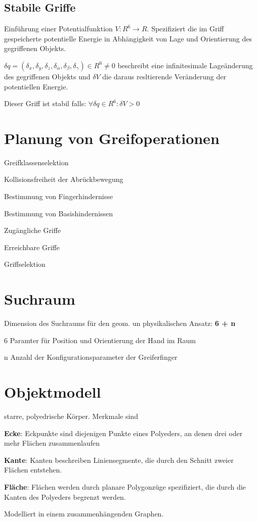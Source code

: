 \subsection{Stabile Griffe}
\begin{compactitem}
    \item Einführung einer Potentialfunktion $V: R^6 \rightarrow R$. Spezifiziert die im Griff gespeicherte
    potentielle Energie in Abhängigkeit von Lage und Orientierung des gegriffenen Objekts.
    \item $\delta q= (\delta_x, \delta_y, \delta_z, \delta_\alpha, \delta_\beta, \delta_\gamma) \in
    R^6 \neq 0$ beschreibt eine infinitesimale Lageänderung des gegriffenen Objekts und $\delta V$ die daraus
    resltierende Veränderung der potentiellen Energie.
    \item Dieser Griff ist stabil falls: $\forall \delta q \in R^6: \delta V > 0$
\end{compactitem}
\section{Planung von Greifoperationen}
\begin{compactenum}
    \item Greifklassenselektion
    \item Kollisionsfreiheit der Abrückbewegung
    \item Bestimmung von Fingerhindernisse
    \item Bestimmung von Basishindernissen
    \item Zugängliche Griffe
    \item Erreichbare Griffe
    \item Griffselektion
\end{compactenum}
\section{Suchraum}
Dimension des Suchraums für den geom. un physikalischen Ansatz: \textbf{6 + n}
\begin{compactitem}
    \item 6 Paramter für Position und Orientierung der Hand im Raum
    \item n Anzahl der Konfigurationsparameter der Greiferfinger
\end{compactitem}
\section{Objektmodell}
starre, polyedrische Körper. Merkmale sind
\begin{compactitem}
    \item \textbf{Ecke}: Eckpunkte sind diejenigen Punkte eines Polyeders, an denen drei oder mehr
    Flächen zusammenlaufen
    \item \textbf{Kante}: Kanten beschreiben Liniensegmente, die durch den Schnitt zweier Flächen
    entstehen.
    \item \textbf{Fläche}: Flächen werden durch planare Polygonzüge spezifiziert, die durch die Kanten
    des Polyeders begrenzt werden.
\end{compactitem}
Modelliert in einem zusammenhängenden Graphen.
